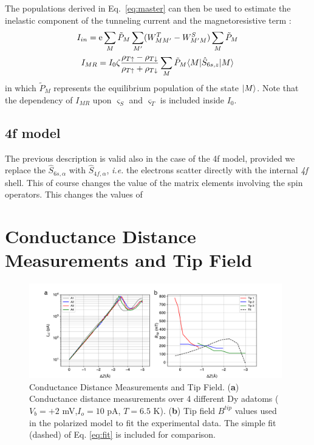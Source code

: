 \documentclass[reprint,amsmath,amssymb,aps,nofootinbib,onecolumn]{revtex4-2}
\begin{document}
The populations derived in Eq.~\ref{eq:master} can then be used to estimate the inelastic component of the tunneling current and the magnetoresistive term \cite{delgado2010}:
\begin{gather}
    I_{in}=\text{e}\sum_M \Tilde{P}_M \sum_{M^{\prime}} (W^{T}_{MM^{\prime}}-W^{S}_{M^{\prime}M})\sum_M \Tilde{P}_M\\
    I_{MR}=I_0\zeta\dfrac{\rho_{T\uparrow}-\rho_{T\downarrow}}{\rho_{T\uparrow}+\rho_{T\downarrow}}\sum_M \tilde{P}_M\langle M|\hat{S}_{6s,z}|{M}\rangle
    \label{eq:I_MR}
\end{gather}
in which $\tilde{P}_M$ represents the equilibrium population of the state $\ket{M}$. Note that the dependency of $I_{MR}$ upon $\varsigma_S$ and $\varsigma_T$ is included inside $I_0$.

\subsection{4f model}
The previous description is valid also in the case of the 4f model, provided we replace the $\hat{S}_{6s,\alpha}$ with $\hat{S}_{4f,\alpha}$, \textit{i.e.} the electrons scatter directly with the internal \textit{4f} shell. This of course changes the value of the matrix elements involving the spin operators. This changes the values of 




\section{Conductance Distance Measurements and Tip Field}
\label{sec:cond-dist}
\begin{figure}[ht!]
\includegraphics[width=0.98\textwidth]{fields_fit2.pdf}
\caption{Conductance Distance Measurements and Tip Field. (\textbf{a}) Conductance distance measurements over 4 different Dy adatoms ($V_{b} = +2$ mV,$I_o = 10$ pA, $T = 6.5$ K). (\textbf{b}) Tip field $B^{tip}$ values used in the polarized model to fit the experimental data. The simple fit (dashed) of Eq. \ref{eq:fit} is included for comparison. 
\label{fig:fields} }
\end{figure}
\end{document}
